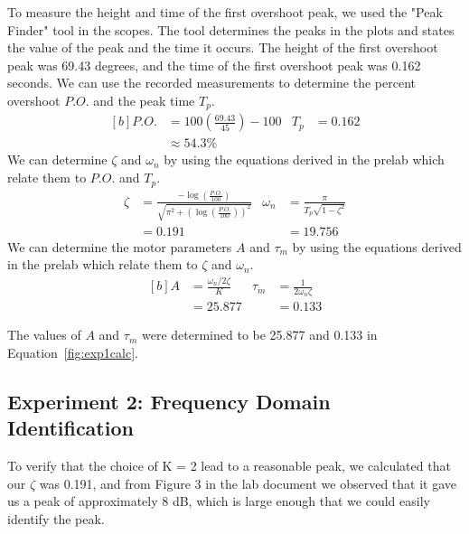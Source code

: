 \documentclass[12pt]{article}
\begin{document}
To measure the height and time of the first overshoot peak, we used the "Peak Finder" tool in the scopes. The tool determines the peaks in the plots and states the value of the peak and the time it occurs. The height of the first overshoot peak was 69.43 degrees, and the time of the first overshoot peak was 0.162 seconds.
We can use the recorded measurements to determine the percent overshoot $P.O.$ and the peak time $T_p$.
\begin{equation*}
\begin{aligned}[b]
    P.O. &= 100\left(\frac{69.43}{45}\right) - 100 & T_p &= 0.162 \\
    &\approx 54.3\%
\end{aligned}
\end{equation*}
We can determine $\zeta$ and $\omega_n$ by using the equations derived in the prelab which relate them to $P.O.$ and $T_p$.
\begin{equation*}
\begin{aligned}
    \zeta &= \frac{-\log\left(\frac{P.O.}{100}\right)}{\sqrt{\pi^2 + \left(\log\left(\frac{P.O.}{100}\right)\right)^2}} & \omega_n &= \frac{\pi}{T_p\sqrt{1-\zeta^2}} \\
    &= 0.191 & &= 19.756
\end{aligned}
\end{equation*}
We can determine the motor parameters $A$ and $\tau_m$ by using the equations derived in the prelab which relate them to $\zeta$ and $\omega_n$.
\begin{equation} \label{fig:exp1calc}
\begin{aligned}[b]
    A &= \frac{\omega_n / 2\zeta}{K} & \tau_m &= \frac{1}{2\omega_n\zeta} \\
    &= 25.877 & &= 0.133
\end{aligned}
\end{equation}

The values of $A$ and $\tau_m$ were determined to be 25.877 and 0.133 in Equation~\ref{fig:exp1calc}.

\subsection{Experiment 2: Frequency Domain Identification}
To verify that the choice of K = 2 lead to a reasonable peak, we calculated that our $\zeta$ was 0.191, and from Figure 3 in the lab document we observed that it gave us a peak of approximately 8 dB, which is large enough that we could easily identify the peak.
\end{document}
